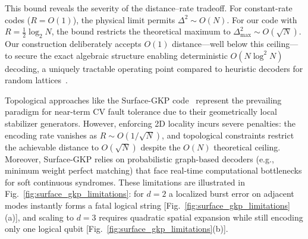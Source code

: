 \documentclass[aps,prl,twocolumn,superscriptaddress]{revtex4-2}
\begin{document}
This bound reveals the severity of the distance--rate tradeoff. For constant-rate codes ($R = O(1)$), the physical limit permits $\Delta^2 \sim O(N)$. For our code with $R = \frac{1}{2}\log_2 N$, the bound restricts the theoretical maximum to $\Delta_{\max}^2 \sim O(\sqrt{N})$. Our construction deliberately accepts $O(1)$ distance---well below this ceiling---to secure the exact algebraic structure enabling deterministic $O(N \log^2 N)$ decoding, a uniquely tractable operating point compared to heuristic decoders for random lattices~\cite{bloemer2026}.



Topological approaches like the Surface-GKP code~\cite{vuillot2019,fukui2018} represent the prevailing paradigm for near-term CV fault tolerance due to their geometrically local stabilizer generators. However, enforcing 2D locality incurs severe penalties: the encoding rate vanishes as $R \sim O(1/\sqrt{N})$, and topological constraints restrict the achievable distance to $O(\sqrt{N})$ despite the $O(N)$ theoretical ceiling. Moreover, Surface-GKP relies on probabilistic graph-based decoders (e.g., minimum weight perfect matching) that face real-time computational bottlenecks for soft continuous syndromes. These limitations are illustrated in Fig.~\ref{fig:surface_gkp_limitations}: for $d=2$ a localized burst error on adjacent modes instantly forms a fatal logical string [Fig.~\ref{fig:surface_gkp_limitations}(a)], and scaling to $d=3$ requires quadratic spatial expansion while still encoding only one logical qubit [Fig.~\ref{fig:surface_gkp_limitations}(b)].
\end{document}
